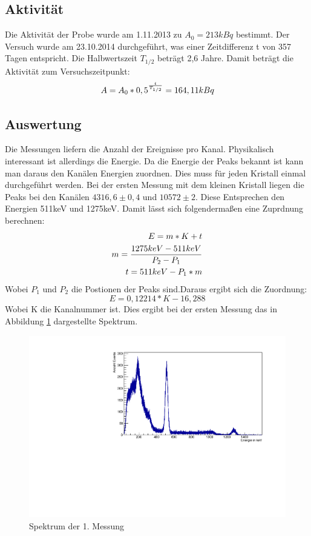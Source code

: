\documentclass[a4paper,11pt,twoside]{article}
\begin{document}
\subsection{Aktivität}
Die Aktivität der Probe wurde am 1.11.2013 zu $A_0=213 kBq$ bestimmt. Der Versuch wurde am 23.10.2014 durchgeführt, was einer Zeitdifferenz t von 357 Tagen entspricht. Die Halbwertszeit $T_{1/2}$ beträgt 2,6 Jahre. Damit beträgt die Aktivität zum Versuchszeitpunkt:
\begin{equation}
A=A_0*0,5^{t\over T_{1/2}}=164,11 kBq
\end{equation}
\subsection{Auswertung}
Die Messungen liefern die Anzahl der Ereignisse pro Kanal. Physikalisch interessant ist allerdings die Energie. Da die Energie der Peaks bekannt ist kann man daraus den Kanälen Energien zuordnen. Dies muss für jeden Kristall einmal durchgeführt werden. Bei der ersten Messung mit dem kleinen Kristall liegen die Peaks bei den Kanälen $4316,6\pm0,4$ und $10572\pm2$. Diese Entsprechen den Energien 511keV und 1275keV.
Damit lässt sich folgendermaßen eine Zuprdnung berechnen:
\begin{align}
E=m*K+t\\
m={{1275keV-511keV}\over{P_2-P_1}}\\
t=511keV-P_1*m
\end{align}
Wobei $P_1$ und $P_2$ die Postionen der Peaks sind.Daraus ergibt sich die Zuordnung:
\begin{equation}
E=0,12214*K-16,288
\end{equation}
Wobei K die Kanalnummer ist.
Dies ergibt bei der ersten Messung das in Abbildung \ref{l1} dargestellte Spektrum.
\begin{figure}[htbp]
\begin{center}
\includegraphics[width=\textwidth]{Messung11.pdf}
\caption{Spektrum der 1. Messung}
\label{l1}
\end{center}
\end{figure}
\end{document}

